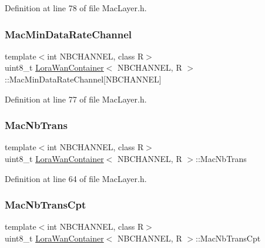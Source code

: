Definition at line 78 of file Mac\+Layer.\+h.

\mbox{\label{class_lora_wan_container_a2f32e42a487c751f736af790b98aece8}} 
\subsubsection{\texorpdfstring{Mac\+Min\+Data\+Rate\+Channel}{MacMinDataRateChannel}}
{\footnotesize\ttfamily template$<$int N\+B\+C\+H\+A\+N\+N\+EL, class R$>$ \\
uint8\+\_\+t \mbox{\hyperlink{class_lora_wan_container}{Lora\+Wan\+Container}}$<$ N\+B\+C\+H\+A\+N\+N\+EL, R $>$\+::Mac\+Min\+Data\+Rate\+Channel\mbox{[}N\+B\+C\+H\+A\+N\+N\+EL\mbox{]}}



Definition at line 77 of file Mac\+Layer.\+h.

\mbox{\label{class_lora_wan_container_a429285e901085c2f0a9b5ddf59f0dc65}} 
\subsubsection{\texorpdfstring{Mac\+Nb\+Trans}{MacNbTrans}}
{\footnotesize\ttfamily template$<$int N\+B\+C\+H\+A\+N\+N\+EL, class R$>$ \\
uint8\+\_\+t \mbox{\hyperlink{class_lora_wan_container}{Lora\+Wan\+Container}}$<$ N\+B\+C\+H\+A\+N\+N\+EL, R $>$\+::Mac\+Nb\+Trans}



Definition at line 64 of file Mac\+Layer.\+h.

\mbox{\label{class_lora_wan_container_af9d590d00503086b62b52a233dc790ed}} 
\subsubsection{\texorpdfstring{Mac\+Nb\+Trans\+Cpt}{MacNbTransCpt}}
{\footnotesize\ttfamily template$<$int N\+B\+C\+H\+A\+N\+N\+EL, class R$>$ \\
uint8\+\_\+t \mbox{\hyperlink{class_lora_wan_container}{Lora\+Wan\+Container}}$<$ N\+B\+C\+H\+A\+N\+N\+EL, R $>$\+::Mac\+Nb\+Trans\+Cpt}



